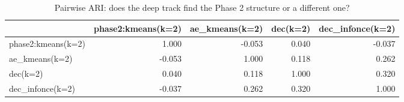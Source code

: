 \begin{table}[htbp]
\centering
\begin{tabular}{lrrrr}
\toprule
 & phase2:kmeans(k=2) & ae\_kmeans(k=2) & dec(k=2) & dec\_infonce(k=2) \\
\midrule
phase2:kmeans(k=2) & 1.000 & -0.053 & 0.040 & -0.037 \\
ae\_kmeans(k=2) & -0.053 & 1.000 & 0.118 & 0.262 \\
dec(k=2) & 0.040 & 0.118 & 1.000 & 0.320 \\
dec\_infonce(k=2) & -0.037 & 0.262 & 0.320 & 1.000 \\
\bottomrule
\end{tabular}
\caption{Pairwise ARI: does the deep track find the Phase 2 structure or a different one?}
\label{tab:phase3-agreement}
\end{table}
